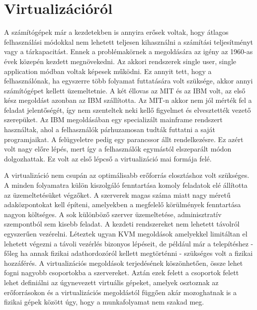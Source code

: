 \documentclass[12pt,oneside,justify,table]{book}
\begin{document}
 




\tableofcontents

\chapter{Virtualizációról}

A számítógépek már a kezdetekben is annyira erősek voltak, hogy átlagos felhasználási módokkal nem lehetett teljesen kihasználni a számítási teljesítményt vagy a tárkapacitást.
Ennek a problémakörnek a megoldására az igény az 1960-as évek közepén kezdett megnövekedni. 
Az akkori rendszerek single user, single application módban voltak képesek működni. 
Ez annyit tett, hogy a felhasználónak, ha egyszerre több folyamat futtatására volt szüksége, akkor annyi számítógépet kellett üzemeltetnie. 
A két éllovas az MIT és az IBM volt, az első kész megoldást azonban az IBM szállította. 
Az MIT-n akkor nem jól mérték fel a feladat jelentőségét, így nem szenteltek neki kellő figyelmet és elvesztették vezető szerepüket. 
Az IBM megoldásában egy specializált mainframe rendszert használtak, ahol a felhasználók párhuzamosan tudták futtatni a saját programjaikat.
A felügyeletre pedig egy parancssor állt rendelkezésre.
Ez azért volt nagy előre lépés, mert így a felhasználók egymástól elszeparált módon dolgozhattak.
Ez volt az első lépcső a virtualizáció mai formája felé.

A virtualizáció nem csupán az optimálisabb erőforrás elosztáshoz volt szükséges. 
A minden folyamatra külön kiszolgáló fenntartása komoly feladatok elé állította az üzemeltetésüket végzőket. 
A szerverek magas száma miatt nagy méretű adaközpontokat kell építeni, amelyekben a megfelelő körülmények fenntartása nagyon költséges. 
A sok különböző szerver üzemeltetése, adminisztratív szempontból sem kisebb feladat. 
A kezdeti rendszereket nem lehetett távolról egyszerűen vezérelni. Léteztek ugyan KVM megoldások amelyekkel limitáltan el lehetett végezni a távoli vezérlés bizonyos lépéseit, de például már a telepítéshez - főleg ha annak fizikai adathordozóról kellett megtörténni - szükséges volt a fizikai hozzáférés. 
A virtualizációs megoldások terjedésének köszönhetően, össze lehet fogni nagyobb csoportokba a szervereket. 
Aztán ezek felett a csoportok felett lehet definiálni az úgynevezett virtuális gépeket, amelyek osztoznak az erőforrásokon és a virtualizációs megoldástól függően akár mozoghatnak is a fizikai gépek között úgy, hogy a munkafolyamat nem szakad meg.
\end{document}
